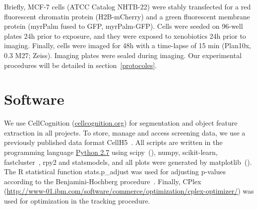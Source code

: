 Briefly, MCF-7 cells (ATCC\up{\textregistered} Catalog NHTB-22\texttrademark) were stably transfected for a red fluorescent chromatin protein (H2B-mCherry) and a green fluorescent membrane protein (myrPalm fused to GFP, myrPalm-GFP). Cells were seeded on 96-well plates 24h prior to exposure, and they were exposed to xenobiotics 24h prior to imaging. Finally, cells were imaged for 48h with a time-lapse of 15 min (Plan10x, 0.3 M27; Zeiss). Imaging plates were sealed during imaging. Our experimental procedures will be detailed in section~\ref{protocoles}.
\section{Software}
We use CellCognition \cite{cellcognition} (\href{http://cellcognition.org}{cellcognition.org}) for segmentation and object feature extraction in all projects. To store, manage and access
screening data, we use a previously published data format CellH5~\cite{Sommer2013}. All scripts are written in the programming language \href{http://www.python.org}{Python 2.7}
using scipy~(\cite{scipy}), numpy, scikit-learn, fastcluster~\cite{fastcluster}, rpy2 and statsmodels, and all plots were generated by matplotlib~(\cite{matplotlib}). The R statistical function stats.p\_adjust was used for adjusting p-values according to the Benjamini-Hochberg procedure~\cite{Benjamini1}. Finally, CPlex \\ (\href{http://www-01.ibm.com/software/commerce/optimization/cplex-optimizer/}{http://www-01.ibm.com/software/commerce/optimization/cplex-optimizer/}) was used for optimization in the tracking procedure.
